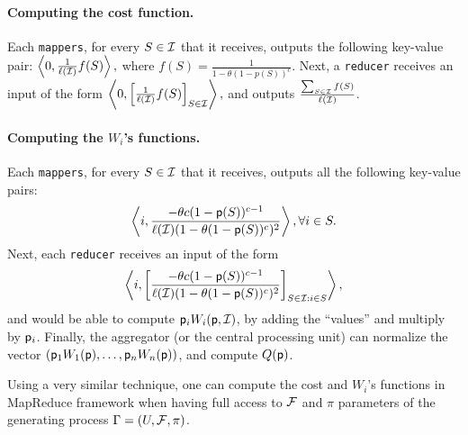 \paragraph{\bf Computing the cost function.}
Each \texttt{mappers}, for every $S\in \mathcal{I}$ that it receives, outputs the following key-value pair:
$\left\langle 0,  \frac{1}{\ell(\mathcal{I})}f(S) \right\rangle,$
where $f(S) = \frac{1}{1- \theta(1-p(S))^c}$.
Next, a \texttt{reducer} receives an input of the form
$\left\langle 0,  \left[\frac{1}{\ell(\mathcal{I})}f(S)\right]_{S\in \mathcal{I}}  \right\rangle,$
and outputs $\frac{\sum_{S\in \mathcal{I}}f(S)}{\ell(\mathcal{I})}$.

\paragraph{\bf Computing  the $W_i$'s functions.}
Each \texttt{mappers}, for every $S\in \mathcal{I}$ that it receives, outputs all the following key-value pairs:
$$\left\langle i,  \frac{-\theta c (1-\mathsf{p}(S))^{c-1}}{\ell(\mathcal{I})(1-\theta(1-\mathsf{p}(S))^c)^2} \right\rangle, \forall i \in S.$$
Next, each \texttt{reducer} receives an input of the form
$$\left\langle i,  \left[\frac{-\theta c (1-\mathsf{p}(S))^{c-1}}{\ell(\mathcal{I})(1-\theta(1-\mathsf{p}(S))^c)^2}\right]_{S\in \mathcal{I}: i\in S} \right\rangle,$$
and would be able to compute $\mathsf{p}_iW_i(\mathsf{p}, \mathcal{I})$, by adding the ``values'' and multiply by $\mathsf{p}_i$.
Finally, the aggregator (or the central processing unit) can normalize the vector $(\mathsf{p}_1W_1(\mathsf{p}), \ldots, \mathsf{p}_nW_n(\mathsf{p}))$, and compute $Q(\mathsf{p})$.

Using a very similar technique, one can compute the cost and $W_i$'s functions
in MapReduce framework when having full access to $\mathcal{F}$ and $\pi$ parameters
of the generating process $\Gamma=(U,\mathcal{F},\pi)$.

